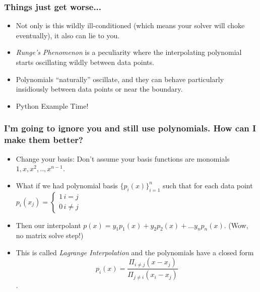 \documentclass{beamer}
\newcommand{\STRset}[1]{\{#1\}}
\begin{document}
\begin{frame}
\frametitle{Things just get worse...}
\begin{itemize}
\item Not only is this wildly ill-conditioned (which means your solver will choke eventually), it also can lie to you.
\item \emph{Runge's Phenomenon} is a peculiarity where the interpolating polynomial starts oscillating wildly between data points.
\item Polynomials ``naturally'' oscillate, and they can behave particularly insidiously between data points or near the boundary.
\item Python Example Time!
\end{itemize}
\end{frame}

\begin{frame}
\frametitle{I'm going to ignore you and still use polynomials. How can I make them better?}
\begin{itemize}
\item Change your basis: Don't assume your basis functions are monomials ${1,x,x^2,..,x^{n-1}}$. 
\item What if we had polynomial basis $\STRset{p_i(x)}_{i=1}^n$ such that for each data point $p_i(x_j) = \begin{cases} 1 \, i = j \\ 0 \, i \neq j \end{cases}$
\item Then our interpolant $p(x) = y_1 p_1(x) + y_2 p_2(x) + ... y_n p_n(x)$. (Wow, no matrix solve step!) 

\item This is called \emph{Lagrange Interpolation} and the polynomials have a closed form $$p_i(x) = \frac{ \Pi_{i \neq j} (x-x_j)}{\Pi_{j \neq i} (x_i -x_j) }$$.
\end{itemize}
\end{frame}
\end{document}
